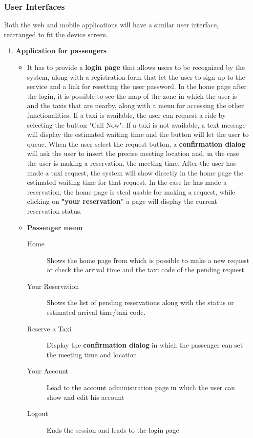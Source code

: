 \documentclass[11pt, a4paper,titlepage]{article}
\begin{document}
\subsubsection{User Interfaces}
Both the web and mobile applications will have a similar user interface, rearranged to fit the device screen.
\begin{enumerate}
	\item \textbf{Application for passengers} \newline
	\begin{itemize}
		\item It has to provide a \textbf{login page} that allows users to be recognized by the system, along with a registration form that let the user to sign up to the service and a link for resetting the user password.
		In the home page after the login, it is possible to see the map of the zone in which the user is and the taxis that are nearby, along with a menu for accessing the other functionalities. If a taxi is available, the user can request a ride by selecting the button "Call Now". If a taxi is not available, a text message will display the estimated waiting time and the button will let the user to queue. When the user select the request button, a \textbf{confirmation dialog} will ask the user to insert the precise meeting location and, in the case the user is making a reservation, the meeting time.
		After the user has made a taxi request, the system will show directly in the home page the  estimated waiting time for that request. In the case he has made a reservation, the home page is steal usable for making a request, while clicking on \textbf{"your reservation"} a page will display the current reservation status.
		\item \textbf{Passenger menu}
		\begin{description}
			\item[Home] Shows the home page from which is possible to make a new request or check the arrival time and the taxi code of the pending request.
			\item[Your Reservation] Shows the list of pending reservations along with the status or estimated arrival time/taxi code.
			\item[Reserve a Taxi] Display the \textbf{confirmation dialog} in which the passenger can set the meeting time and location
			\item[Your Account] Lead to the account administration page in which the user can show and edit his account
			\item[Logout] Ends the session and leads to the login page

\end{description}
\end{itemize}
\end{enumerate}
\end{document}
